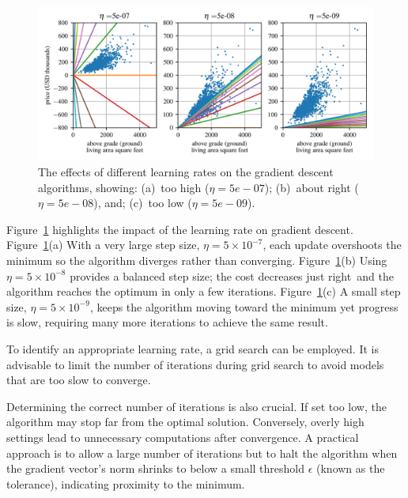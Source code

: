 \documentclass[12pt,letter]{article}
\begin{document}
		\begin{figure}[H]
			\centering
			\includegraphics[width=6.5in]{../figures/Ames_learning_rates.png}
			\caption{The effects of different learning rates on the gradient descent algorithms, showing: (a)~too high ($\eta = 5e-07$); (b)~about right ($\eta = 5e-08$), and; (c)~too low ($\eta = 5e-09$).}
			\label{fig:learning_rates}
		\end{figure}


Figure~\ref{fig:learning_rates} highlights the impact of the learning rate on gradient descent.  
Figure~\ref{fig:learning_rates}(a) With a very large step size, \(\eta = 5\times10^{-7}\), each update overshoots the minimum so the algorithm diverges rather than converging.  
Figure~\ref{fig:learning_rates}(b) Using \(\eta = 5\times10^{-8}\) provides a balanced step size; the cost decreases just right~\protect\footnotemark[1] and the algorithm reaches the optimum in only a few iterations.   
Figure~\ref{fig:learning_rates}(c) A small step size, \(\eta = 5\times10^{-9}\), keeps the algorithm moving toward the minimum yet progress is slow, requiring many more iterations to achieve the same result.


	




To identify an appropriate learning rate, a grid search can be employed. It is advisable to limit the number of iterations during grid search to avoid models that are too slow to converge.

Determining the correct number of iterations is also crucial. If set too low, the algorithm may stop far from the optimal solution. Conversely, overly high settings lead to unnecessary computations after convergence. A practical approach is to allow a large number of iterations but to halt the algorithm when the gradient vector's norm shrinks to below a small threshold $\epsilon$ (known as the tolerance), indicating proximity to the minimum.
\end{document}
